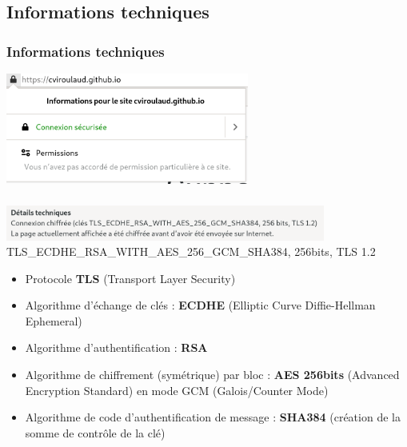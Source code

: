 \documentclass[svgnames,11pt]{beamer}
\begin{document}
\subsection{Informations techniques}
\begin{frame}
    \frametitle{Informations techniques}

    \begin{center}
    \centering
    \includegraphics[width=8cm]{ressources/cadenas.png}
    \label{IMG}
    \end{center}

\end{frame}
\begin{frame}
    \frametitle{}

    \begin{center}
    \centering
    \includegraphics[width=10.5cm]{ressources/chiffrement.png}
        TLS\_ECDHE\_RSA\_WITH\_AES\_256\_GCM\_SHA384, 256bits, TLS 1.2
    \end{center}
\begin{itemize}
    \item Protocole \textbf{TLS} (Transport Layer Security)
    \item Algorithme d’échange de clés : \textbf{ECDHE} (Elliptic Curve Diffie-Hellman Ephemeral)
    \item Algorithme d’authentification : \textbf{RSA}
    \item Algorithme de chiffrement (symétrique) par bloc : \textbf{AES 256bits} (Advanced Encryption Standard) en mode GCM (Galois/Counter Mode)
    \item Algorithme de code d’authentification de message : \textbf{SHA384} (création de la somme de contrôle de la clé)
\end{itemize}
\end{frame}
\end{document}
